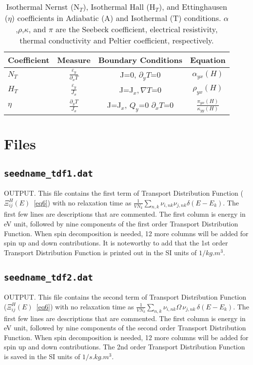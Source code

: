 \begin{table}
 \caption{Isothermal Nernst (N$_{T}$), Isothermal Hall (H$_{T}$), and Ettinghausen ($\eta$) coefficients in Adiabatic (A) and Isothermal (T) conditions. $\alpha$,$\rho$,$\kappa$, and $\pi$ are the Seebeck coefficient, electrical resistivity, thermal conductivity and Peltier coefficient, respectively.}
 \centering
 \noindent
 \begin{tabular}{lccc} %
    \hline
    \hline
    \textbf{Coefficient} &\textbf{Measure} &\textbf{Boundary Conditions} & \textbf{Equation}  \\
    \hline
    \hline
   $N_{T}$  & $\frac{\varepsilon_y}{\partial_x T}$ & J=0, $ \partial_yT\textbf{=}0$ & $\alpha_{yx}(H)$   \\
    $H_{T}$  & $\frac{\varepsilon_y}{J_x }$ &  J=J$_x, \nabla T\textbf{=}0$ & $\rho _{yx}(H)$ \\
    $\eta$    & $\frac{\partial_yT}{J_x}$ &  J=J$_x$, $Q_y\textbf{=}0$ $\partial_xT\textbf{=}0$ & $\frac{\pi_{yx}(H)}{\kappa_{yy}(H)}$\\
    \hline  
    \hline 
 \end{tabular}
 \label{TMco}
\end{table}

\section{Files}

\subsection{{\tt seedname\_tdf1.dat}}
OUTPUT. This file contains the first term of Transport Distribution Function ($\Xi_{ij}^H(E)$~\ref{eq6}) with no relaxation time as $\frac{1}{VN_k}\sum_{n,k}\nu_{i,nk}\nu_{j,nk}\delta(E-E_{k})$. The first few lines are descriptions that are commented. The first column is energy in eV unit, followed by nine components of the first order Transport Distribution Function. When spin decomposition is needed, 12  more columns will be added for spin up and down contributions.  It is noteworthy to add that the 1st order Transport Distribution Function is printed out in the SI units of  $1/kg.m^3$.   
\subsection{{\tt seedname\_tdf2.dat}}
OUTPUT. This file contains the second term of Transport Distribution Function ($\Xi_{ij}^H(E)$~\ref{eq6}) with no relaxation time as $\frac{1}{VN_k}\sum_{n,k}\nu_{i,nk}\Omega\,\nu_{j,nk}\,\delta(E-E_{k})$. The first few lines are descriptions that are commented. The first column is energy in eV unit, followed by nine components of the second order Transport Distribution Function. When spin decomposition is needed, 12  more columns will be added for spin up and down contributions.  The 2nd order Transport Distribution Function is saved in the SI units of  $1/s.kg.m^3$. 
